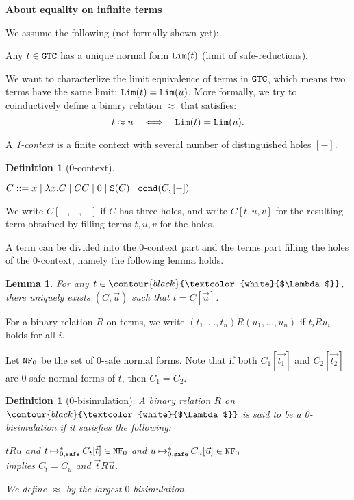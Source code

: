 \documentclass{article}
\newcommand\Lim[1]{{\tt Lim}(#1)}
\newcommand{\GTC}{{\tt GTC}}
\newcommand{\Cond}[2]{{\tt cond}(#1,#2)}
\newcommand{\Suc}[1]{{\tt S}(#1)}
\newcommand{\safe}{ {\hbox{\scriptsize \tt safe}} }
\newcommand{\reduces}{\mathbin{\mapsto}}
\newcommand{\nsafeReducesAst}[1] {\mathbin{\reduces_{#1,\safe}^*}}
\newcommand{\NFZ}{{\tt NF}_0}
\newcommand\outline[1]{{\contour{black}{\textcolor{white}{#1}}}}
\newcommand{\LAMBDA}{{\outline{$\Lambda$}}}
\newtheorem{lemma}[theorem]{Lemma}
\newtheorem{definition}[theorem]{Definition}
\newenvironment{remark}[1][Remark]{\begin{trivlist}
\item[\hskip \labelsep {\bfseries #1}]}{\end{trivlist}}
\begin{document}
{\Large\bf About equality on infinite terms}

\vspace{10pt}

\begin{remark}
  We assume the following (not formally shown yet):
  \begin{center}
    Any $t\in \GTC$ has a unique normal form $\Lim{t}$ (limit of safe-reductions).
  \end{center}
\end{remark}

\quad
We want to characterlize the limit equivalence of terms in $\GTC$, 
which means two terms have the same limit: $\Lim{t} = \Lim{u}$. 
More formally, we try to coinductively define a binary relation $\approx$ that satisfies:
\[
t \approx u \quad \Longleftrightarrow \quad \Lim{t} = \Lim{u}. 
\]

A {\em 1-context} is a finite context with several number of distinguished holes $[-]$.

\begin{definition}[0-context]
  \begin{center}
    $C ::= x \mid \lambda x.C \mid CC \mid 0 \mid \Suc{C} \mid \Cond{C}{[-]}$
  \end{center}
\end{definition}

We write $C[-,-,-]$ if $C$ has three holes, and write $C[t,u,v]$ for the resulting term
obtained by filling terms $t,u,v$ for the holes. 

A term can be divided into the 0-context part and the terms part filling the holes of the 0-context,
namely the following lemma holds. 
\begin{lemma}
  For any $t\in \LAMBDA$, there uniquely exists $(C,\vec{u})$ such that $t = C[\vec{u}]$. 
\end{lemma}

For a binary relation $R$ on terms,
we write $(t_1,\ldots,t_n)R(u_1,\ldots,u_n)$ if $t_iRu_i$ holds for all $i$. 

Let $\NFZ$ be the set of $0$-safe normal forms. 
Note that if both $C_1[\vec{t_1}]$ and $C_2[\vec{t_2}]$ are $0$-safe normal forms of $t$, then $C_1=C_2$.
  
\begin{definition}[0-bisimulation]\rm
  A binary relation $R$ on $\LAMBDA$ is said to be a {\em 0-bisimulation} if it satisfies the following:
  \begin{center}
    $tRu$ and $t \nsafeReducesAst{0} C_t[\vec{t}] \in \NFZ$ and $u \nsafeReducesAst{0} C_u[\vec{u}] \in \NFZ$
    \\
    \quad
    implies
    \quad
    $C_t = C_u$ and $\vec{t}R\vec{u}$. 
  \end{center}
  
  We define $\approx$ by the largest $0$-bisimulation.
\end{definition}
\end{document}
